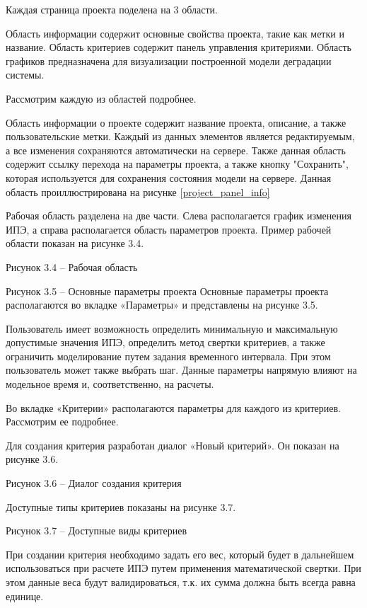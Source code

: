 Каждая страница проекта поделена на 3 области.

Область информации содержит основные свойства проекта, такие как метки и название.
Область критериев содержит панель управления критериями. 
Область графиков предназначена для визуализации построенной модели деградации системы.

Рассмотрим каждую из областей подробнее.

Область информации о проекте содержит название проекта, описание, а также пользовательские метки. 
Каждый из данных элементов является редактируемым, а все изменения сохраняются автоматически на сервере.
Также данная область содержит ссылку перехода на параметры проекта, а также кнопку "Сохранить", которая используется для сохранения состояния модели на сервере.
Данная область проиллюстрирована на рисунке \ref{project_panel_info}

 
Рабочая область разделена на две части. 
Слева располагается график изменения ИПЭ, а справа располагается область параметров проекта. 
Пример рабочей области показан на рисунке 3.4.

 
Рисунок 3.4 – Рабочая область

 
Рисунок 3.5 – Основные параметры проекта
Основные параметры проекта располагаются во вкладке «Параметры» и представлены на рисунке 3.5.

Пользователь имеет возможность определить минимальную и максимальную допустимые значения ИПЭ, определить метод свертки критериев, а также ограничить моделирование путем задания временного интервала. 
При этом пользователь может также выбрать шаг. 
Данные параметры напрямую влияют на модельное время и, соответственно, на расчеты.

Во вкладке «Критерии» располагаются параметры для каждого из критериев. 
Рассмотрим ее подробнее.

Для создания критерия разработан диалог «Новый критерий». 
Он показан на рисунке 3.6.

 
Рисунок 3.6 – Диалог создания критерия

Доступные типы критериев показаны на рисунке 3.7.
 
Рисунок 3.7 – Доступные виды критериев

При создании критерия необходимо задать его вес, который будет в дальнейшем использоваться при расчете ИПЭ путем применения математической свертки.
При этом данные веса будут валидироваться, т.к. их сумма должна быть всегда равна единице.

